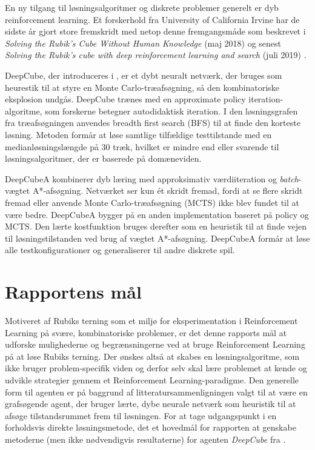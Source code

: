 \documentclass[../main.tex]{subfiles}
\begin{document}
En ny tilgang til løsningsalgoritmer og diskrete problemer generelt er dyb reinforcement learning.
Et forskerhold fra University of California Irvine har de sidste år gjort store fremskridt med netop denne fremgangsmåde som beskrevet i \textit{Solving the Rubik's Cube Without Human Knowledge} (maj 2018) \cite{HumansBeGone} og senest \textit{Solving the Rubik’s cube with deep reinforcement learning and search} (juli 2019) \cite{SolvingNature}.

DeepCube, der introduceres i \cite{HumansBeGone}, er et dybt neuralt netværk, der bruges som heurestik til at styre en Monte Carlo-træafsøgning, så den kombinatoriske eksplosion undgås.
DeepCube trænes med en approximate policy iteration-algoritme, som forskerne betegner autodidaktisk iteration.
I den løsningsgrafen fra træafsøgningen anvendes breadth first search (BFS) til at finde den korteste løsning.
Metoden formår at løse samtlige tilfældige testtilstande med en medianløsningslængde på 30 træk, hvilket er mindre end eller svarende til løsningsalgoritmer, der er baserede på domæneviden.

DeepCubeA \cite{SolvingNature} kombinerer dyb læring med approksimativ værdiiteration og \emph{batch}-vægtet A*-afsøgning.
Netværket ser kun ét skridt fremad, fordi at se flere skridt fremad eller anvende Monte Carlo-træafsøgning (MCTS) ikke blev fundet til at være bedre.
DeepCubeA bygger på en anden implementation baseret på policy og MCTS.
Den lærte kostfunktion bruges derefter som en heuristik til at finde vejen til løsningstilstanden ved brug af vægtet A*-afsøgning.
DeepCubeA formår at løse alle testkonfigurationer og generaliserer til andre diskrete spil.


\section{Rapportens mål}
Motiveret af Rubiks terning som et miljø for eksperimentation i Reinforcement Learning på svære, kombinatoriske problemer, er det denne rapports mål at udforske mulighederne og begrænsningerne ved at bruge Reinforcement Learning på at løse Rubiks terning.
Der ønskes altså at skabes en løsningsalgoritme, som ikke bruger problem-specifik viden og derfor selv skal lære problemet at kende og udvikle strategier gennem et Reinforcement Learning-paradigme. 
Den generelle form til agenten er på baggrund af litteratursammenligningen valgt til at være en grafsøgende agent, der bruger lærte, dybe neurale netværk som heuristik til at afsøge tilstandsrummet frem til løsningen. For at tage udgangspunkt i en forholdsvis direkte løsningsmetode, det et hovedmål for rapporten at genskabe metoderne (men ikke nødvendigvis resultaterne) for agenten \textit{DeepCube} fra \cite{HumansBeGone}.
\end{document}
